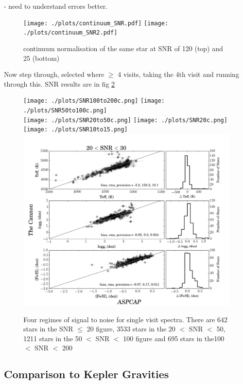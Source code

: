 \documentclass[12pt, preprint]{aastex}
\begin{document}
 - need to understand errors better. 
 
 
\begin{figure}[h!]
  \texttt{[image: ./plots/continuum\_SNR.pdf]}
    \texttt{[image: ./plots/continuum\_SNR2.pdf]}
  
\caption{continuum normalisation of the same star at SNR of 120 (top) and 25 (bottom) }
\label{fig:lowsnr}
\end{figure}

Now step through, selected where $\ge$ 4 visits, taking the 4th visit and running through this. SNR results are in fig \ref{fig:SNR}

 \begin{figure}[h!]
 \texttt{[image: ./plots/SNR100to200c.png]}
\texttt{[image: ./plots/SNR50to100c.png]}\\
\texttt{[image: ./plots/SNR20to50c.png]}
\texttt{[image: ./plots/SNR20c.png]}\\
\texttt{[image: ./plots/SNR10to15.png]}
\includegraphics[scale=0.24]{./plots/SNR20to30.png}
  \caption{Four regimes of signal to noise for single visit spectra. There are 642 stars in the SNR $\le$ 20 figure, 3533 stars in the 20 $<$ SNR $<$ 50, 1211 stars in the 50 $<$ SNR $<$ 100 figure and 695 stars in the100 $<$  SNR $<$ 200}
\label{fig:SNR}
\end{figure}


\subsection{Comparison to Kepler Gravities}
\end{document}
